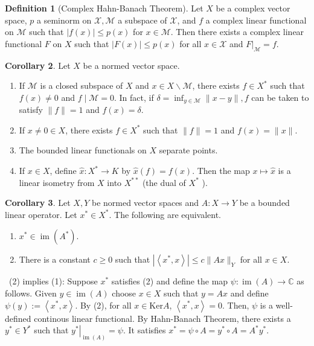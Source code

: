 \documentclass[12pt,a4paper]{book}
\newenvironment{prooff}{{\noindent\it\textcolor{cyan!40!black}{Proof}:}\,}{\par}
\newenvironment{enu}{\begin{enumerate}[(1)]}{\end{enumerate}}
\theoremstyle{definition}
\newtheorem{defn}{Definition}[section]
\newtheorem{coro}[defn]{Corollary}
\begin{document}
\begin{defn}[Complex Hahn-Banach Theorem]
    Let $X$ be a complex vector space, $p$ a seminorm on $\mathcal{X}, \mathcal{M}$ a subspace of $\mathcal{X}$, and $f$ a complex linear functional on $\mathcal{M}$ such that $|f(x)| \leq p(x)$ for $x \in \mathcal{M}$. 
    Then there exists a complex linear functional $F$ on $X$ 
    such that $|F(x)| \leq p(x)$ for all $x \in \mathcal{X}$ and $\left.F\right|_\mathcal{M}=f$.
\end{defn}
\begin{coro}
    Let $X$ be a normed vector space.
    \begin{enu}
    \item If $\mathcal{M}$ is a closed subspace of $X$ and $x \in X \backslash \mathcal{M}$, there exists $f \in X^*$ such that $f(x) \neq 0$ and $f \mid \mathcal{M}=0$. In fact, if $\delta=\inf _{y \in \mathcal{M}}\|x-y\|, f$ can be taken to satisfy $\|f\|=1$ and $f(x)=\delta$.
    \item If $x \neq 0 \in X$, there exists $f \in X^*$ such that $\|f\|=1$ and $f(x)=\|x\|$.
    \item The bounded linear functionals on $X$ separate points.
    \item If $x \in X$, define $\widehat{x}: X^* \rightarrow K$ by $\widehat{x}(f)=f(x)$. Then the map $x \mapsto \widehat{x}$ is a linear isometry from $X$ into $X^{* *}$ (the dual of $X^*$ ).
    \end{enu}
\end{coro}
\begin{coro}
    Let $X, Y$ be normed vector spaces and 
    $A: X \rightarrow Y$ be a bounded linear operator. 
    Let $x^* \in X^*$. The following are equivalent.
\begin{enu} 
    \item $x^* \in \operatorname{im}\left(A^*\right)$.
    \item  There is a constant $c \geq 0$ such that $\left|\left\langle x^*, x\right\rangle\right| \leq c\|A x\|_Y$ for all $x \in X$.
\end{enu}
\label{corollary: im(A^*) equivalent def}
\end{coro}
\begin{prooff}
    (2) implies (1):
    Suppose $x^*$ satisfies (2) and define the map $\psi: \operatorname{im}(A) \rightarrow \mathbb{C}$ as follows. Given $y \in \operatorname{im}(A)$ choose $x \in X$ such that $y=A x$ and define $\psi(y):=\left\langle x^*, x\right\rangle$.
By (2), for all $x\in \text{Ker}A$, $\left\langle x^*, x\right\rangle=0$. 
Then, $\psi$ is a well-defined continous linear functional. 
By Hahn-Banach Theorem, there exists a $y^* \in Y^*$ such that $\left.y^*\right|_{\operatorname{im}(A)}=\psi$. It satisfies $x^*=\psi \circ A=y^* \circ A=A^* y^*$. 


\end{prooff}
\end{document}
